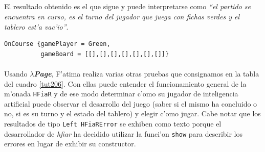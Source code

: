 \documentclass[a4paper]{article}
\newcommand{\hpage}{\textbf{\textsl{$\lambda$Page}}}
\begin{document}
\subparagraph{}El resultado obtenido es el que sigue y puede interpretarse como \textsl{``el partido se encuentra en curso, es el turno del jugador que juega con fichas verdes y el tablero est'a vac'io''}.
\begin{center}\begin{lstlisting}
OnCourse {gamePlayer = Green,
          gameBoard = [[],[],[],[],[],[],[]]}
\end{lstlisting}\end{center}
\newpage
\paragraph{}Usando \hpage, F'atima realiza varias otras pruebas que consignamos en la tabla del cuadro \ref{tut206}.  Con ellas puede entender el funcionamiento general de la m'onada \texttt{HFiaR} y de ese modo determinar c'omo su jugador de inteligencia artificial puede observar el desarrollo del juego (saber si el mismo ha concluido o no, si es su turno y el estado del tablero) y elegir c'omo jugar.  Cabe notar que los resultados de tipo \texttt{Left HFiaRError} se exhiben como texto porque el desarrollador de \textsl{hfiar} ha decidido utilizar la funci'on \texttt{show} para describir los errores en lugar de exhibir su constructor.
\end{document}

